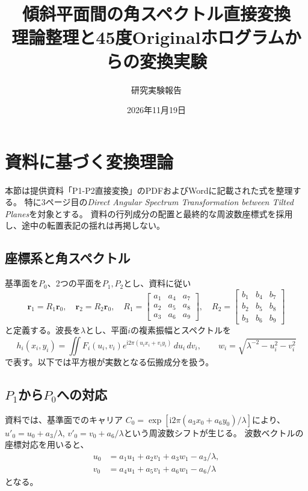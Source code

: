 \documentclass[a4paper,10pt]{ltjsarticle}
\title{傾斜平面間の角スペクトル直接変換\\理論整理と45度Originalホログラムからの変換実験}
\author{研究実験報告}
\date{2026年11月19日}
\begin{document}
\maketitle\small
\section{資料に基づく変換理論}
本節は提供資料「P1-P2直接変換」のPDFおよびWordに記載された式を整理する。
特に3ページ目の\textit{Direct Angular Spectrum Transformation between Tilted Planes}を対象とする。
資料の行列成分の配置と最終的な周波数座標式を採用し、途中の転置表記の揺れは再掲しない。

\subsection{座標系と角スペクトル}
基準面を$P_0$、2つの平面を$P_1,P_2$とし、資料に従い
\begin{equation}
 \boldsymbol r_1=R_1\boldsymbol r_0,\quad
 \boldsymbol r_2=R_2\boldsymbol r_0,\quad
 R_1=\begin{bmatrix}a_1&a_4&a_7\\a_2&a_5&a_8\\a_3&a_6&a_9\end{bmatrix},\quad
 R_2=\begin{bmatrix}b_1&b_4&b_7\\b_2&b_5&b_8\\b_3&b_6&b_9\end{bmatrix}
\end{equation}
と定義する。波長を$\lambda$とし、平面$i$の複素振幅とスペクトルを
\begin{equation}
 h_i(x_i,y_i)=\iint F_i(u_i,v_i)e^{\mathrm i2\pi(u_ix_i+v_iy_i)}\,du_i\,dv_i,
 \qquad w_i=\sqrt{\lambda^{-2}-u_i^2-v_i^2}
\end{equation}
で表す。以下では平方根が実数となる伝搬成分を扱う。

\subsection{$P_1$から$P_0$への対応}
資料では、基準面でのキャリア
$C_0=\exp[\mathrm i2\pi(a_3x_0+a_6y_0)/\lambda]$により、
$u'_0=u_0+a_3/\lambda$, $v'_0=v_0+a_6/\lambda$という周波数シフトが生じる。
波数ベクトルの座標対応を用いると、
\begin{align}
 u_0&=a_1u_1+a_2v_1+a_3w_1-a_3/\lambda,\\
 v_0&=a_4u_1+a_5v_1+a_6w_1-a_6/\lambda
\end{align}
となる。
\end{document}
